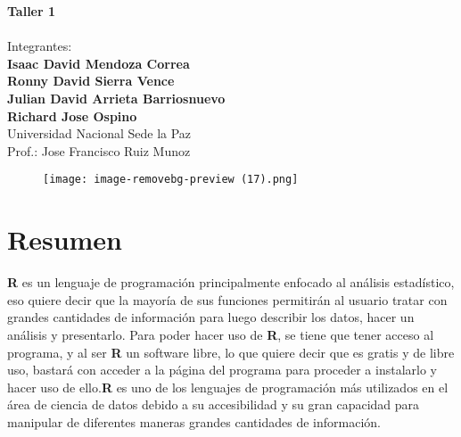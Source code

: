 \documentclass{article}
\begin{document}
 \begin{center}
{\Large \textbf{Taller 1}}\\
\vspace{0.5cm}
\textbf\\
\vspace{1 cm}
Integrantes: \\
\textbf{Isaac David Mendoza Correa}\\
\textbf{Ronny David Sierra Vence}\\
\textbf{Julian David Arrieta Barriosnuevo}\\
\textbf{Richard Jose Ospino }\\
\vspace{0.2cm}
\vspace{1 cm}
Universidad Nacional Sede la Paz\\

Prof.: Jose Francisco Ruiz Munoz\\

\end{center}

\begin{center}
 \begin{figure}
    \centering
    \texttt{[image: image-removebg-preview (17).png]}
    \label{fig:DTU logo}
 \end{figure}
\end{center} 

\thispagestyle{empty}

\newpage




\section{Resumen}
\textbf{R} es un lenguaje de programación principalmente enfocado al análisis estadístico, eso quiere decir que la mayoría de sus funciones permitirán al usuario tratar con grandes cantidades de información para luego describir los datos, hacer un análisis y presentarlo. Para poder hacer uso de \textbf{R}, se tiene que tener acceso al programa, y al ser \textbf{R} un software libre, lo que quiere decir que es gratis y de libre uso, bastará con acceder a la página del programa para proceder a instalarlo y hacer uso de ello.\textbf{R} es uno de los lenguajes de programación más utilizados en el área de ciencia de datos debido a su accesibilidad y su gran capacidad para manipular de diferentes maneras grandes cantidades de información.
\end{document}
